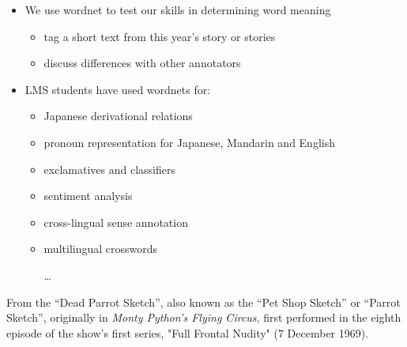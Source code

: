\documentclass[headrule,footrule]{foils}
\begin{document}




\begin{itemize}
\item We use wordnet to test our skills in determining word meaning
  \begin{itemize}
  \item tag a short text from this year's story or stories
  \item discuss differences with other annotators
 \end{itemize}
\item   LMS students have used wordnets for:
  \begin{itemize}
  \item  Japanese derivational
relations \citep{Bond:Wei:2019}
\item  pronoun representation for Japanese, Mandarin and English
  \citep{Seah:Bond:2014}
\item exclamatives and classifiers
\citep{Mok:Gao:Bond:2012,daCosta:Bond:2016}
\item  sentiment analysis
  \citep{Le:Moeljadi:Miura:Ohkuma:2016,Bond:Janz:Piasecki:2019}
\item cross-lingual sense annotation \citep{Bonansinga:Bond:2016}
\item multilingual crosswords \citep{Tan:2012}
\item [\ldots]
\end{itemize}
\end{itemize}




\begin{quote} \large
\end{quote}

From the ``Dead Parrot Sketch'', also known as the ``Pet Shop Sketch''
or ``Parrot Sketch'', originally in \textit{Monty Python's Flying Circus},
first performed in the eighth episode of the show's first series,
"Full Frontal Nudity" (7 December 1969).
\end{document}
